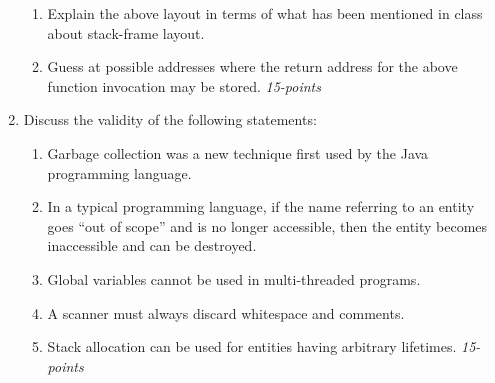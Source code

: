 \documentclass[12pt]{article}
\begin{document}
\begin{enumerate}
\begin{enumerate}
\item Explain the above layout in terms of what has been mentioned
  in class about stack-frame layout.

\item Guess at possible addresses where the return address for
  the above function invocation may be stored. \hfill\textit{15-points}

  \end{enumerate}

\item Discuss the validity of the following statements:  
  
\begin{enumerate}
\item Garbage collection was a new technique first used by the
  Java programming language.

\item In a typical programming language, if the name referring to an
  entity goes ``out of scope'' and is no longer accessible, then the
  entity becomes inaccessible and can be destroyed.

\item Global variables cannot be used in multi-threaded programs.

\item A scanner must always discard whitespace and comments.

\item Stack allocation can be used for entities having arbitrary
lifetimes. \hfill\textit{15-points}

    
\end{enumerate}

\end{enumerate}
\end{document}
